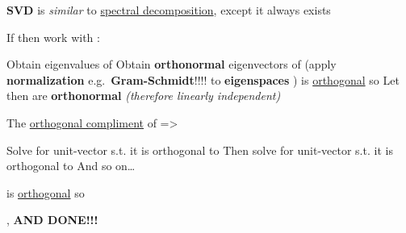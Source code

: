 \hSep %

\textbf{SVD} is \emph{similar} to \underline{spectral decomposition}, except it always exists

If  then work with :
\begin{itemize}
      \vItem
            Obtain eigenvalues
             of
      \vItem
            Obtain \textbf{orthonormal} eigenvectors
             of
             (apply \textbf{normalization}
            e.g.~\textbf{Gram-Schmidt}!!!! to \textbf{eigenspaces}
            )
      \vItem
            is \underline{orthogonal} so 
      \vItem
      \vItem
            Let
            then
             are
            \textbf{orthonormal} \emph{(therefore linearly independent)}

            \begin{itemize}

                  \vItem
                        The \underline{orthogonal compliment} of
                        =\textgreater{}

                        \begin{itemize}

                              \vItem
                                    Solve for unit-vector  s.t. it is
                                    orthogonal to 
                              \vItem
                                    Then solve for unit-vector  s.t. it is
                                    orthogonal to 
                              \vItem
                                    And so on\ldots{}
                        \end{itemize}
                  \vItem
                        is \underline{orthogonal} so 
            \end{itemize}
      \vItem
            ,
            \textbf{AND DONE!!!}
\end{itemize}

